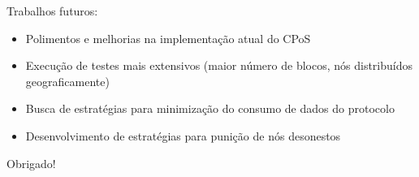 \documentclass{beamer}
\begin{document}
\begin{frame}
Trabalhos futuros:
\begin{itemize}
    \item Polimentos e melhorias na implementação atual do CPoS
    \item Execução de testes mais extensivos (maior número de blocos, nós distribuídos geograficamente)
    \item Busca de estratégias para minimização do consumo de dados do protocolo
    \item Desenvolvimento de estratégias para punição de nós desonestos
\end{itemize}
\end{frame}

\begin{frame}
    Obrigado!
\end{frame}
\end{document}
